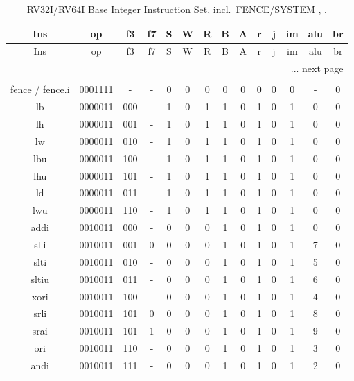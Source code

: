 \begin{longtable}{|c<{\raggedright}|c<{\raggedright}|c<{\raggedright}|c|c|c|c|c|c|c|c|c|c|c|} %
\caption{RV32I/RV64I Base Integer Instruction Set, incl.\ FENCE/SYSTEM \cite{riscvisa01}, \cite{riscvisa02}, \cite{riscvisa03}}\\
\hline
Ins & op & f3 & f7 & S & W & R & B & A & r & j & im & alu & br \\
\hline
\endfirsthead
Ins & op & f3 & f7 & S & W & R & B & A & r & j & im & alu & br \\
\hline
\endhead
\multicolumn{14}{r}{... next page}\\
\endfoot
\hline
\multicolumn{14}{r}{EoT} \\
\endlastfoot
fence / fence.i & 0001111 & - & - & 0 & 0 & 0 & 0 & 0 & 0 & 0 & 0 & - & 0 \\
\hline
lb & 0000011 & 000 & - & 1 & 0 & 1 & 1 & 0 & 1 & 0 & 1 & 0 & 0 \\
\hline
lh & 0000011 & 001 & - & 1 & 0 & 1 & 1 & 0 & 1 & 0 & 1 & 0 & 0 \\
\hline
lw & 0000011 & 010 & - & 1 & 0 & 1 & 1 & 0 & 1 & 0 & 1 & 0 & 0 \\
\hline
lbu & 0000011 & 100 & - & 1 & 0 & 1 & 1 & 0 & 1 & 0 & 1 & 0 & 0 \\
\hline
lhu & 0000011 & 101 & - & 1 & 0 & 1 & 1 & 0 & 1 & 0 & 1 & 0 & 0 \\
\hline
ld & 0000011 & 011 & - & 1 & 0 & 1 & 1 & 0 & 1 & 0 & 1 & 0 & 0 \\
\hline
lwu & 0000011 & 110 & - & 1 & 0 & 1 & 1 & 0 & 1 & 0 & 1 & 0 & 0 \\
\hline
addi & 0010011 & 000 & - & 0 & 0 & 0 & 1 & 0 & 1 & 0 & 1 & 0 & 0 \\
\hline
slli & 0010011 & 001 & 0 & 0 & 0 & 0 & 1 & 0 & 1 & 0 & 1 & 7 & 0 \\
\hline
slti & 0010011 & 010 & - & 0 & 0 & 0 & 1 & 0 & 1 & 0 & 1 & 5 & 0 \\
\hline
sltiu & 0010011 & 011 & - & 0 & 0 & 0 & 1 & 0 & 1 & 0 & 1 & 6 & 0 \\
\hline
xori & 0010011 & 100 & - & 0 & 0 & 0 & 1 & 0 & 1 & 0 & 1 & 4 & 0 \\
\hline
srli & 0010011 & 101 & 0 & 0 & 0 & 0 & 1 & 0 & 1 & 0 & 1 & 8 & 0 \\
\hline
srai & 0010011 & 101 & 1 & 0 & 0 & 0 & 1 & 0 & 1 & 0 & 1 & 9 & 0 \\
\hline
ori & 0010011 & 110 & - & 0 & 0 & 0 & 1 & 0 & 1 & 0 & 1 & 3 & 0 \\
\hline
andi & 0010011 & 111 & - & 0 & 0 & 0 & 1 & 0 & 1 & 0 & 1 & 2 & 0 \\

\end{longtable}
